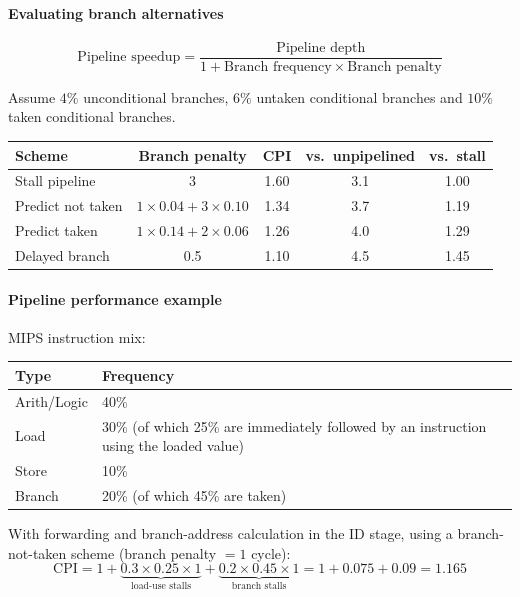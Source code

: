 \paragraph{Evaluating branch alternatives}

\begin{prop}
\[
  \text{Pipeline speedup} = \frac{\text{Pipeline depth}}{1+\text{Branch frequency} \times \text{Branch penalty}}
\]
\end{prop}

\begin{eg}
Assume $4\%$ unconditional branches, $6\%$ untaken conditional branches and
$10\%$ taken conditional branches.

\begin{center}
\small
\begin{tabular}{@{}lcccc@{}}
\toprule
Scheme & Branch penalty & CPI & vs.\ unpipelined & vs.\ stall \\
\midrule
Stall pipeline    & 3                         & 1.60 & 3.1 & 1.00 \\
Predict not taken & $1{\times}0.04+3{\times}0.10$ & 1.34 & 3.7 & 1.19 \\
Predict taken     & $1{\times}0.14+2{\times}0.06$ & 1.26 & 4.0 & 1.29 \\
Delayed branch    & 0.5                       & 1.10 & 4.5 & 1.45 \\
\bottomrule
\end{tabular}
\end{center}

\end{eg}

\paragraph{Pipeline performance example}

\begin{eg}
MIPS instruction mix:

\begin{center}
\begin{tabular}{@{}lp{9.5cm}@{}}
\toprule
Type & Frequency \\
\midrule
Arith/Logic & 40\% \\
Load        & 30\% (of which 25\% are immediately followed by an instruction using the loaded value) \\
Store       & 10\% \\
Branch      & 20\% (of which 45\% are taken) \\
\bottomrule
\end{tabular}
\end{center}

With forwarding and branch-address calculation in the ID stage, using a
branch-not-taken scheme (branch penalty $=1$ cycle):
\[
  \mathrm{CPI} = 1 + \underbrace{0.3\times0.25\times1}_{\text{load-use stalls}} + \underbrace{0.2\times0.45\times1}_{\text{branch stalls}} = 1 + 0.075 + 0.09 = 1.165
\]
\end{eg}

